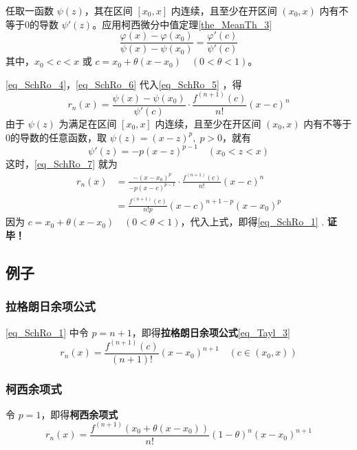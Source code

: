 任取一函数 $\psi(z)$，其在区间 $[x_0,x]$ 内连续，且至少在开区间 $(x_0,x)$ 内有不等于0的导数 $\psi'(z)$。应用柯西微分中值定理\autoref{the_MeanTh_3}~
\begin{equation}\label{eq_SchRo_5}
\frac{\varphi(x)-\varphi(x_0)}{\psi(x)-\psi(x_0)}=\frac{\varphi'(c)}{\psi'(c)}
\end{equation}
其中，$x_0<c<x$ 或 $c=x_0+\theta(x-x_0)\quad(0<\theta<1)$。

\autoref{eq_SchRo_4}，\autoref{eq_SchRo_6}  代入\autoref{eq_SchRo_5} ，得
\begin{equation}\label{eq_SchRo_7}
r_n(x)=\frac{\psi(x)-\psi(x_0)}{\psi'(c)}\cdot\frac{f^{(n+1)}(c)}{n!}(x-c)^n
\end{equation}
由于 $\psi(z)$ 为满足在区间 $[x_0,x]$ 内连续，且至少在开区间 $(x_0,x)$ 内有不等于0的导数的任意函数，取 $\psi(z)=(x-z)^p,\;p>0$，就有
\begin{equation}
\psi'(z)=-p(x-z)^{p-1}\quad (x_0<z<x)
\end{equation}
这时，\autoref{eq_SchRo_7} 就为
\begin{equation}
\begin{aligned}
r_n(x)&=\frac{-(x-x_0)^p}{-p(x-c)^{p-1}}\cdot\frac{f^{(n+1)}(c)}{n!}(x-c)^n\\
&=\frac{f^{(n+1)}(c)}{n!p}(x-c)^{n+1-p}(x-x_0)^p
\end{aligned}
\end{equation}
因为 $c=x_0+\theta(x-x_0)\quad(0<\theta<1)$，代入上式，即得\autoref{eq_SchRo_1} .
\textbf{证毕！}

\subsection{例子}
\subsubsection{拉格朗日余项公式}
\autoref{eq_SchRo_1} 中令 $p=n+1$，即得\textbf{拉格朗日余项公式}\autoref{eq_Tayl_3}~
\begin{equation}
r_n(x)=\frac{f^{(n+1)}(c)}{(n+1)!}(x-x_0)^{n+1}\quad (c\in(x_0,x))
\end{equation}
\subsubsection{柯西余项式}
令 $p=1$，即得\textbf{柯西余项式}
\begin{equation}
r_n(x)=\frac{f^{(n+1)}(x_0+\theta(x-x_0))}{n!}(1-\theta)^{n}(x-x_0)^{n+1}
\end{equation}
